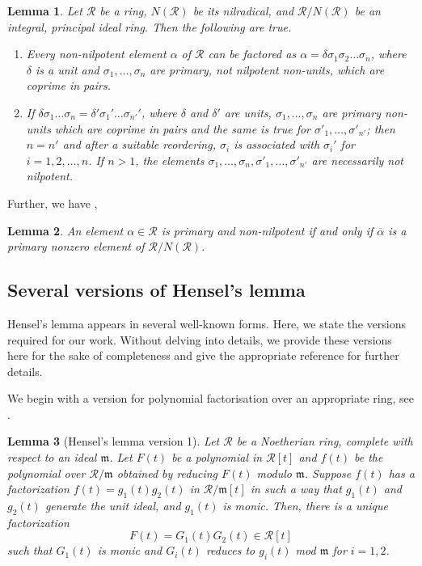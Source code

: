 \documentclass[11pt,twoside]{amsart}
\newtheorem{lemma}{Lemma}[section]
\theoremstyle{definition} %
\begin{document}
\begin{lemma}\label{lem:snap-factor}
Let $\mathscr R$ be a ring, $N(\mathscr R)$ be its nilradical, and $\mathscr R/N(\mathscr R)$ be an integral, principal ideal ring. Then the following are true.
\begin{enumerate}
\item Every non-nilpotent element $\alpha$ of $\mathscr R$ can be factored as $\alpha = \delta \sigma_1\sigma_2\ldots\sigma_n$, where $\delta$ is a unit and $\sigma_1,\ldots,\sigma_n$ are primary, not nilpotent non-units, which are coprime in pairs.
\item If $\delta \sigma_1 \ldots \sigma_n = \delta' \sigma_1' \ldots \sigma_{n'}'$, where $\delta$ and $\delta'$ are units, $\sigma_1, \ldots, \sigma_n$ are primary non-units which are coprime in pairs and the same is true for $\sigma'_1,\ldots, \sigma'_{n'}$; then $n = n'$ and after a suitable reordering, $\sigma_i$ is associated with $\sigma_i'$ for $i=1, 2, \ldots, n$. If $n> 1$, the elements $\sigma_1, \ldots,\sigma_n, \sigma'_1, \ldots, \sigma'_{n'}$ are necessarily not nilpotent.
\end{enumerate}
\end{lemma}
\noindent Further, we have \cite[p. 673]{Snapper1950},
\begin{lemma}\label{lem:primary-modulo}
An element $\alpha\in \mathscr R$ is primary and non-nilpotent if and only if $\overline{\alpha}$ is a primary nonzero element of $\mathscr R/N(\mathscr R)$.
\end{lemma}

\subsection{Several versions of Hensel's lemma}\label{subsec-hens-lem} 

Hensel's lemma appears in several well-known forms. Here, we state the versions required for our work. Without delving into details, we provide these versions here for the sake of completeness and give the appropriate reference for further details.

We begin with a version for polynomial factorisation over an appropriate ring, see \cite[Theorem 7.18]{Eisenbud95}. 
\begin{lemma}[Hensel's lemma version 1]\label{hensel-1}
Let $\mathscr R$ be a Noetherian ring, complete with respect to an ideal $\mathfrak{m}$. Let $F(t)$ be a polynomial in $\mathscr R[t]$ and $f(t)$ be the polynomial over $\mathscr R/\mathfrak{m}$ obtained by reducing $F(t)$ modulo $\mathfrak{m}$. Suppose $f(t)$ has a factorization $f(t) = g_1(t)g_2(t)$ in $\mathscr R/\mathfrak{m}[t]$ in such a way that $g_1(t)$ and $g_2(t)$ generate the unit ideal, and $g_1(t)$ is monic. Then, there is a unique factorization $$F(t)=G_1(t)G_2(t)\in \mathscr R[t]$$ such that $G_1(t)$ is monic and $G_i(t)$ reduces to $g_i(t)$ mod $\mathfrak{m}$ for $i=1, 2$.
\end{lemma}
\end{document}
